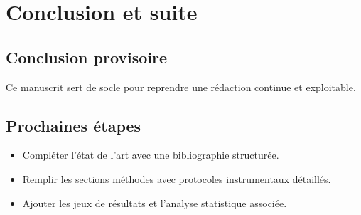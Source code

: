 \chapter{Conclusion et suite}

\section{Conclusion provisoire}
Ce manuscrit sert de socle pour reprendre une rédaction continue et exploitable.

\section{Prochaines étapes}
\begin{itemize}
  \item Compléter l’état de l’art avec une bibliographie structurée.
  \item Remplir les sections méthodes avec protocoles instrumentaux détaillés.
  \item Ajouter les jeux de résultats et l’analyse statistique associée.
\end{itemize}
